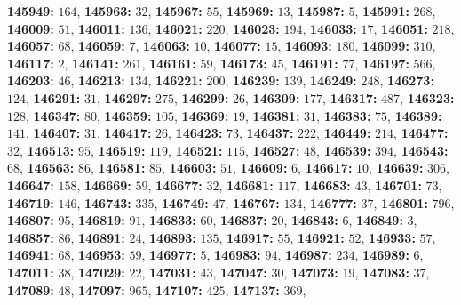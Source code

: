 \textsf{\bfseries 145949:} $164$, \textsf{\bfseries 145963:} $32$, \textsf{\bfseries 145967:} $55$, \textsf{\bfseries 145969:} $13$, \textsf{\bfseries 145987:} $5$, \textsf{\bfseries 145991:} $268$, \textsf{\bfseries 146009:} $51$, \textsf{\bfseries 146011:} $136$, \textsf{\bfseries 146021:} $220$, \textsf{\bfseries 146023:} $194$, \textsf{\bfseries 146033:} $17$, \textsf{\bfseries 146051:} $218$, \textsf{\bfseries 146057:} $68$, \textsf{\bfseries 146059:} $7$, \textsf{\bfseries 146063:} $10$, \textsf{\bfseries 146077:} $15$, \textsf{\bfseries 146093:} $180$, \textsf{\bfseries 146099:} $310$, \textsf{\bfseries 146117:} $2$, \textsf{\bfseries 146141:} $261$, \textsf{\bfseries 146161:} $59$, \textsf{\bfseries 146173:} $45$, \textsf{\bfseries 146191:} $77$, \textsf{\bfseries 146197:} $566$, \textsf{\bfseries 146203:} $46$, \textsf{\bfseries 146213:} $134$, \textsf{\bfseries 146221:} $200$, \textsf{\bfseries 146239:} $139$, \textsf{\bfseries 146249:} $248$, \textsf{\bfseries 146273:} $124$, \textsf{\bfseries 146291:} $31$, \textsf{\bfseries 146297:} $275$, \textsf{\bfseries 146299:} $26$, \textsf{\bfseries 146309:} $177$, \textsf{\bfseries 146317:} $487$, \textsf{\bfseries 146323:} $128$, \textsf{\bfseries 146347:} $80$, \textsf{\bfseries 146359:} $105$, \textsf{\bfseries 146369:} $19$, \textsf{\bfseries 146381:} $31$, \textsf{\bfseries 146383:} $75$, \textsf{\bfseries 146389:} $141$, \textsf{\bfseries 146407:} $31$, \textsf{\bfseries 146417:} $26$, \textsf{\bfseries 146423:} $73$, \textsf{\bfseries 146437:} $222$, \textsf{\bfseries 146449:} $214$, \textsf{\bfseries 146477:} $32$, \textsf{\bfseries 146513:} $95$, \textsf{\bfseries 146519:} $119$, \textsf{\bfseries 146521:} $115$, \textsf{\bfseries 146527:} $48$, \textsf{\bfseries 146539:} $394$, \textsf{\bfseries 146543:} $68$, \textsf{\bfseries 146563:} $86$, \textsf{\bfseries 146581:} $85$, \textsf{\bfseries 146603:} $51$, \textsf{\bfseries 146609:} $6$, \textsf{\bfseries 146617:} $10$, \textsf{\bfseries 146639:} $306$, \textsf{\bfseries 146647:} $158$, \textsf{\bfseries 146669:} $59$, \textsf{\bfseries 146677:} $32$, \textsf{\bfseries 146681:} $117$, \textsf{\bfseries 146683:} $43$, \textsf{\bfseries 146701:} $73$, \textsf{\bfseries 146719:} $146$, \textsf{\bfseries 146743:} $335$, \textsf{\bfseries 146749:} $47$, \textsf{\bfseries 146767:} $134$, \textsf{\bfseries 146777:} $37$, \textsf{\bfseries 146801:} $796$, \textsf{\bfseries 146807:} $95$, \textsf{\bfseries 146819:} $91$, \textsf{\bfseries 146833:} $60$, \textsf{\bfseries 146837:} $20$, \textsf{\bfseries 146843:} $6$, \textsf{\bfseries 146849:} $3$, \textsf{\bfseries 146857:} $86$, \textsf{\bfseries 146891:} $24$, \textsf{\bfseries 146893:} $135$, \textsf{\bfseries 146917:} $55$, \textsf{\bfseries 146921:} $52$, \textsf{\bfseries 146933:} $57$, \textsf{\bfseries 146941:} $68$, \textsf{\bfseries 146953:} $59$, \textsf{\bfseries 146977:} $5$, \textsf{\bfseries 146983:} $94$, \textsf{\bfseries 146987:} $234$, \textsf{\bfseries 146989:} $6$, \textsf{\bfseries 147011:} $38$, \textsf{\bfseries 147029:} $22$, \textsf{\bfseries 147031:} $43$, \textsf{\bfseries 147047:} $30$, \textsf{\bfseries 147073:} $19$, \textsf{\bfseries 147083:} $37$, \textsf{\bfseries 147089:} $48$, \textsf{\bfseries 147097:} $965$, \textsf{\bfseries 147107:} $425$, \textsf{\bfseries 147137:} $369$, 
